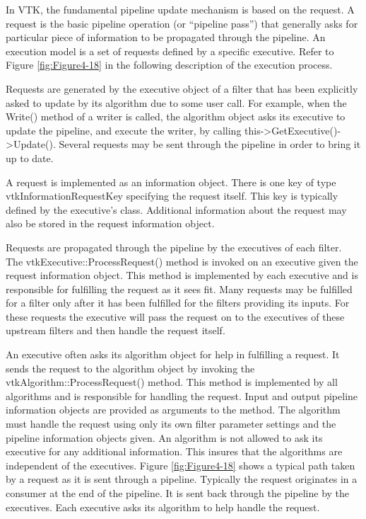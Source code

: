 \begin{description}[leftmargin=0cm,labelindent=0cm]
\item[Pipeline Execution Models]
\label{subsubsec:pipeline_execution_models}

In VTK, the fundamental pipeline update mechanism is based on the request. A request is the basic pipeline operation (or ``pipeline pass'') that generally asks for particular piece of information to be propagated through the pipeline. An execution model is a set of requests defined by a specific executive. Refer to Figure \ref{fig:Figure4-18} in the following description of the execution process.

Requests are generated by the executive object of a filter that has been explicitly asked to update by its algorithm due to some user call. For example, when the Write() method of a writer is called, the algorithm object asks its executive to update the pipeline, and execute the writer, by calling this->GetExecutive()->Update(). Several requests may be sent through the pipeline in order to bring it up to date.

A request is implemented as an information object. There is one key of type vtkInformationRequestKey specifying the request itself. This key is typically defined by the executive's class. Additional information about the request may also be stored in the request information object.
       
Requests are propagated through the pipeline by the executives of each filter. The vtkExecutive::ProcessRequest() method is invoked on an executive given the request information object. This method is implemented by each executive and is responsible for fulfilling the request as it sees fit. Many requests may be fulfilled for a filter only after it has been fulfilled for the filters providing its inputs. For these requests the executive will pass the request on to the executives of these upstream filters and then handle the request itself.

An executive often asks its algorithm object for help in fulfilling a request. It sends the request to the algorithm object by invoking the vtkAlgorithm::ProcessRequest() method. This method is implemented by all algorithms and is responsible for handling the request. Input and output pipeline information objects are provided as arguments to the method. The algorithm must handle the request using only its own filter parameter settings and the pipeline information objects given. An algorithm is not allowed to ask its executive for any additional information. This insures that the algorithms are independent of the executives. Figure \ref{fig:Figure4-18} shows a typical path taken by a request as it is sent through a pipeline. Typically the request originates in a consumer at the end of the pipeline. It is sent back through the pipeline by the executives. Each executive asks its algorithm to help handle the request.
\end{description}


